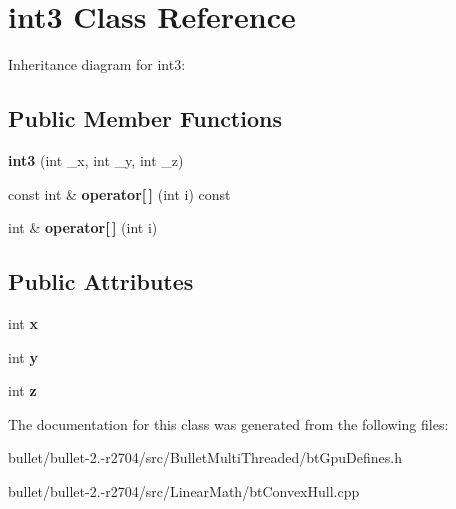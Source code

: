 \hypertarget{structint3}{\section{int3 Class Reference}
\label{structint3}
}


Inheritance diagram for int3\+:
\subsection*{Public Member Functions}
\begin{DoxyCompactItemize}
\item 
\hypertarget{structint3_a7eb209ad94b37395d5b70fd97688fefa}{{\bfseries int3} (int \+\_\+x, int \+\_\+y, int \+\_\+z)}\label{structint3_a7eb209ad94b37395d5b70fd97688fefa}

\item 
\hypertarget{structint3_af240db428dff478c359e58598281afc5}{const int \& {\bfseries operator\mbox{[}$\,$\mbox{]}} (int i) const }\label{structint3_af240db428dff478c359e58598281afc5}

\item 
\hypertarget{structint3_a63600dcd35d1d8a1f7ba9969d0ca220a}{int \& {\bfseries operator\mbox{[}$\,$\mbox{]}} (int i)}\label{structint3_a63600dcd35d1d8a1f7ba9969d0ca220a}

\end{DoxyCompactItemize}
\subsection*{Public Attributes}
\begin{DoxyCompactItemize}
\item 
\hypertarget{structint3_a0a4ad50a155a35fa938ce6f16930affa}{int {\bfseries x}}\label{structint3_a0a4ad50a155a35fa938ce6f16930affa}

\item 
\hypertarget{structint3_a5d95e23491677d61019f0354b16adca9}{int {\bfseries y}}\label{structint3_a5d95e23491677d61019f0354b16adca9}

\item 
\hypertarget{structint3_a5cd5a3c388fa28814e3496ef07c39360}{int {\bfseries z}}\label{structint3_a5cd5a3c388fa28814e3496ef07c39360}

\end{DoxyCompactItemize}


The documentation for this class was generated from the following files\+:\begin{DoxyCompactItemize}
\item 
bullet/bullet-\/2.-\/r2704/src/\+Bullet\+Multi\+Threaded/bt\+Gpu\+Defines.\+h\item 
bullet/bullet-\/2.-\/r2704/src/\+Linear\+Math/bt\+Convex\+Hull.\+cpp\end{DoxyCompactItemize}

